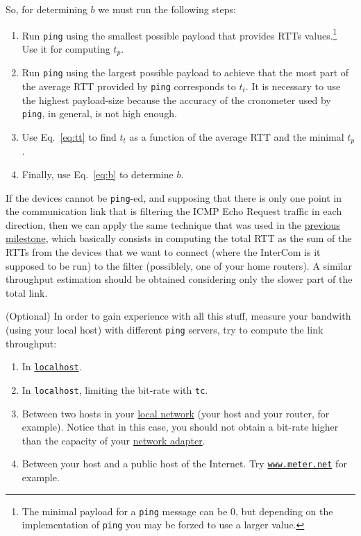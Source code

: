 So, for determining $b$ we must run the following steps:
\begin{enumerate}
\item Run \texttt{ping} using the smallest possible payload that
  provides RTTs values.\footnote{The minimal payload for a
    \texttt{ping} message can be 0, but depending on the
    implementation of \texttt{ping} you may be forzed to use a larger
    value.} Use it for computing $t_p$.
  
\item Run \texttt{ping} using the largest possible payload to achieve
  that the most part of the average RTT provided by \texttt{ping}
  corresponds to $t_t$. It is necessary to use the highest
  payload-size because the accuracy of the cronometer used by
  \texttt{ping}, in general, is not high enough.
  
\item Use Eq.~\eqref{eq:tt} to find $t_t$ as a function of the average
  RTT and the minimal $t_p$.
  
\item Finally, use Eq.~\eqref{eq:b} to determine $b$.
\end{enumerate}

If the devices cannot be \texttt{ping}-ed, and supposing that there is
only one point in the communication link that is filtering the ICMP
Echo Request traffic in each direction, then we can apply the same
technique that was used in the
\href{https://tecnologias-multimedia.github.io/study_guide/latency/}{previous
  milestone}, which basically consists in computing the total RTT as
the sum of the RTTs from the devices that we want to connect (where
the InterCom is it supposed to be run) to the filter (possiblely, one
of your home routers). A similar throughput estimation should be
obtained considering only the slower part of the total link.

(Optional) In order to gain experience with all this stuff, measure
your bandwith (using your local host) with different \texttt{ping}
servers, try to compute the link throughput:
\begin{enumerate}
\item In \href{https://en.wikipedia.org/wiki/Localhost}{\texttt{localhost}}.
\item In \texttt{localhost}, limiting the bit-rate with \texttt{tc}.
\item Between two hosts in your
  \href{https://en.wikipedia.org/wiki/Local_area_network}{local
    network} (your host and your router, for example). Notice that in
  this case, you should not obtain a bit-rate higher than the capacity
  of your
  \href{https://en.wikipedia.org/wiki/Network_interface_controller}{network
    adapter}.
\item Between your host and a public host of the Internet. Try
  \href{https://www.meter.net/}{\texttt{www.meter.net}} for example.
\end{enumerate}

